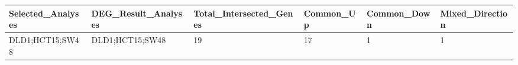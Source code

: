 \begingroup
\tiny
\setlength{\tabcolsep}{2pt}
\renewcommand{\arraystretch}{1.18}
\begin{tabular}{@{}llllll@{}}
\toprule
Selected\_Analyses & DEG\_Result\_Analyses & Total\_Intersected\_Genes & Common\_Up & Common\_Down & Mixed\_Direction \\
\midrule
DLD1;HCT15;SW48 & DLD1;HCT15;SW48 & 19 & 17 & 1 & 1 \\
\bottomrule
\end{tabular}
\endgroup
